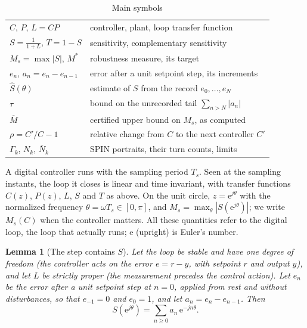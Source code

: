 \documentclass[letterpaper, 10 pt, conference]{ieeeconf}
\newtheorem{lemma}{Lemma}
\newcommand{\spin}{SPIN\xspace}
\begin{document}
\begin{table}[t]
\centering
\caption{Main symbols}
\label{tab:symbols}
\footnotesize\setlength{\tabcolsep}{4pt}
\begin{tabular}{@{}ll@{}}
\toprule
$C$, $P$, $L=CP$ & controller, plant, loop transfer function\\
$S=\frac1{1+L}$, $T=1-S$ & sensitivity, complementary sensitivity\\
$M_s=\max|S|$, $M^*$ & robustness measure, its target\\
$e_n$, $a_n=e_n-e_{n-1}$ & error after a unit setpoint step, its increments\\
$\hat S(\theta)$ & estimate of $S$ from the record $e_0,\dots,e_N$\\
$\tau$ & bound on the unrecorded tail $\sum_{n>N}|a_n|$\\
$\overline M$ & certified upper bound on $M_s$, as computed\\
$\rho=C'/C-1$ & relative change from $C$ to the next controller $C'$\\
$\Gamma_k$, $N_k$, $\bar N_k$ & \spin portraits, their turn counts, limits\\
\bottomrule
\end{tabular}
\end{table}

A digital controller runs with the sampling period $T_s$. Seen at the
sampling instants, the loop it closes is linear and time invariant, with
transfer functions $C(z)$, $P(z)$, $L$, $S$ and $T$ as above. On the
unit circle, $z=\mathrm{e}^{j\theta}$ with the normalized frequency
$\theta=\omega T_s\in[0,\pi]$, and
$M_s=\max_{\theta}|S(\mathrm{e}^{j\theta})|$; we write $M_s(C)$ when the
controller matters. All these quantities refer to the digital loop, the
loop that actually runs; $\mathrm{e}$ (upright) is Euler's number.

\begin{lemma}[The step contains $S$]
\label{lem:record}
Let the loop be stable and have one degree of freedom (the controller
acts on the error $e=r-y$, with setpoint $r$ and output $y$), and let $L$
be strictly proper (the measurement precedes the control action). Let
$e_n$ be the error after a unit setpoint step at $n=0$, applied from
rest and without disturbances, so that $e_{-1}=0$ and $e_0=1$, and let
$a_n=e_n-e_{n-1}$. Then
\begin{equation}
S(\mathrm{e}^{j\theta})=\sum_{n\ge0}a_n\,\mathrm{e}^{-jn\theta}.
\label{eq:srecord}
\end{equation}
\end{lemma}
\end{document}
